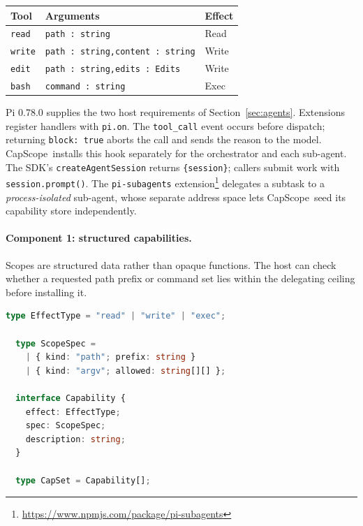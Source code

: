 \documentclass[sigplan,review,anonymous]{acmart}
\newcommand{\tool}{CapScope\xspace}
\begin{document}
  \begin{center}
  \small
  \setlength{\tabcolsep}{5pt}
  \begin{tabular}{@{} l p{3.6cm} l @{}}
  \toprule
  \textbf{Tool} & \textbf{Arguments} & \textbf{Effect} \\
  \midrule
  \texttt{read}
    & \texttt{path : string}
    & \textsf{Read}  \\
  \texttt{write}
    & \texttt{path : string,\newline content : string}
    & \textsf{Write} \\
  \texttt{edit}
    & \texttt{path : string,\newline edits : Edits}
    & \textsf{Write} \\
  \texttt{bash}
    & \texttt{command : string}
    & \textsf{Exec}  \\
  \bottomrule
  \end{tabular}
  \end{center}

  Pi 0.78.0 supplies the two host requirements of Section~\ref{sec:agents}.
  Extensions register handlers with \texttt{pi.on}. The \texttt{tool\_call}
  event occurs before dispatch; returning \texttt{block: true} aborts the call
  and sends the reason to the model. \tool\ installs this hook separately for
  the orchestrator and each sub-agent. The SDK's
  \texttt{createAgentSession} returns \texttt{\{session\}}; callers submit work
  with \texttt{session.prompt()}. The \texttt{pi-subagents}
  extension\footnote{\url{https://www.npmjs.com/package/pi-subagents}} delegates
  a subtask to a \emph{process-isolated} sub-agent, whose separate address
  space lets \tool\ seed its capability store independently.

  \paragraph{Component 1: structured capabilities.}
  Scopes are structured data rather than opaque functions. The host can check
  whether a requested path prefix or command set lies within the delegating
  ceiling before installing it.

  \begin{lstlisting}[language=TypeScript,style=tsstyle,caption={Schematic
    pseudocode for the structured capability type.}]
  type EffectType = "read" | "write" | "exec";

  type ScopeSpec =
    | { kind: "path"; prefix: string }
    | { kind: "argv"; allowed: string[][] };

  interface Capability {
    effect: EffectType;
    spec: ScopeSpec;
    description: string;
  }

  type CapSet = Capability[];
  \end{lstlisting}
\end{document}
